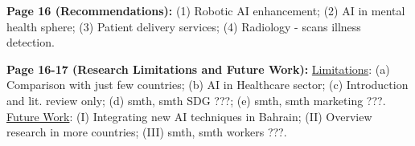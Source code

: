     \textbf{Page 16 (Recommendations):}
    (1) Robotic AI enhancement;
    (2) AI in mental health sphere;
    (3) Patient delivery services;
    (4) Radiology - scans illness detection.

    \textbf{Page 16-17 (Research Limitations and Future Work):}
    \underline{Limitations}:
    (a) Comparison with just few countries;
    (b) AI in Healthcare sector;
    (c) Introduction and lit. review only;
    (d) smth, smth SDG ???;
    (e) smth, smth marketing ???.
    \underline{Future Work}:
    (I) Integrating new AI techniques in Bahrain;
    (II) Overview research in more countries;
    (III) smth, smth workers ???.